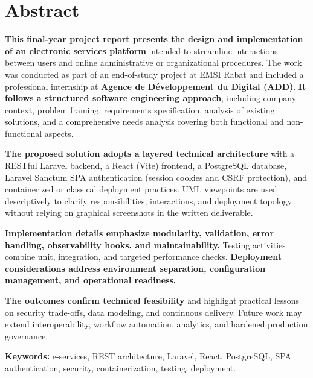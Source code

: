 \chapter*{Abstract}
{}

\textbf{This final-year project report presents the design and implementation of an electronic services platform} intended to streamline interactions between users and online administrative or organizational procedures. The work was conducted as part of an end-of-study project at EMSI Rabat and included a professional internship at \textbf{Agence de Développement du Digital (ADD)}. \textbf{It follows a structured software engineering approach}, including company context, problem framing, requirements specification, analysis of existing solutions, and a comprehensive needs analysis covering both functional and non-functional aspects.

\textbf{The proposed solution adopts a layered technical architecture} with a RESTful Laravel backend, a React (Vite) frontend, a PostgreSQL database, Laravel Sanctum SPA authentication (session cookies and CSRF protection), and containerized or classical deployment practices. UML viewpoints are used descriptively to clarify responsibilities, interactions, and deployment topology without relying on graphical screenshots in the written deliverable.

\textbf{Implementation details emphasize modularity, validation, error handling, observability hooks, and maintainability.} Testing activities combine unit, integration, and targeted performance checks. \textbf{Deployment considerations address environment separation, configuration management, and operational readiness.}

\textbf{The outcomes confirm technical feasibility} and highlight practical lessons on security trade-offs, data modeling, and continuous delivery. Future work may extend interoperability, workflow automation, analytics, and hardened production governance.

\vspace{0.8cm}
\noindent\textbf{Keywords:} e-services, REST architecture, Laravel, React, PostgreSQL, SPA authentication, security, containerization, testing, deployment.

\cleardoublepage